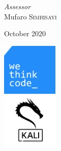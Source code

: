 \begin{titlepage}
	\vfill
	{\large\textit{Assessor}}\\
	Mufaro \textsc{Simbisayi}\\ %
	
	\vfill\vfill\vfill %
	
	\large{October 2020}\\ %
	
	
	\vfill\vfill
	
	\includegraphics[width=0.2\textwidth]{0.title/index.png}\\[1cm] %
	\includegraphics[width=0.2\textwidth]{0.title/docker.png}\\[1cm] %
	
	\vfill %
	
\end{titlepage}


%
